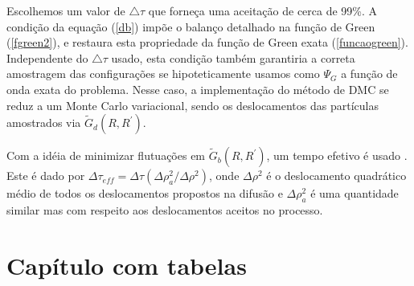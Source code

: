 \documentclass[12pt,twoside,a4paper]{report}
\begin{document}
\noindent Escolhemos um valor de $\triangle \tau$ que forneça
uma aceitação de cerca de 99\%. A condição da equação (\ref{db}) impõe o balanço
detalhado na função de
Green (\ref{fgreen2}),
e restaura esta propriedade da função de Green exata (\ref{funcaogreen}).
Independente do $\triangle\tau$
usado, esta condição também garantiria a correta amostragem das
configurações se
hipoteticamente usamos como $\Psi_G$ a função de onda exata do
problema. Nesse caso,
a implementação do método de DMC se reduz a um Monte Carlo
variacional, sendo os
deslocamentos das partículas amostrados via $\tilde{G}_d(R,R^{'})$.

Com a idéia de minimizar flutuações em $\tilde{G}_b(R,R^{'})$, um
tempo efetivo é usado \cite{rey82,umr93}. Este é dado por
$\Delta\tau_{eff}=\Delta\tau (\Delta
\rho^2_a/\Delta \rho^2)$, onde $\Delta \rho^2$ é o deslocamento quadrático
médio de todos os deslocamentos propostos na
difusão e $\Delta
\rho^2_a$ é uma quantidade similar mas com respeito aos
deslocamentos aceitos no
processo.



\chapter{Capítulo com tabelas} \label{mpot}
\end{document}

